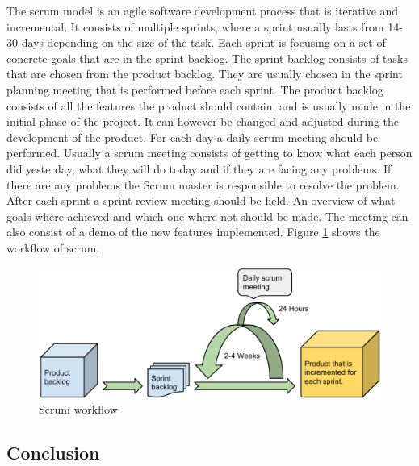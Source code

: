 The scrum model is an agile software development process that is iterative and incremental.
It consists of multiple sprints, where a sprint usually lasts from 14-30 days depending on the size of the task.
Each sprint is focusing on a set of concrete goals that are in the sprint backlog.
The sprint backlog consists of tasks that are chosen from the product backlog. 
They are usually chosen in the sprint planning meeting that is performed before each sprint.
The product backlog consists of all the features the product should contain, and is usually made in the initial phase of the project.
It can however be changed and adjusted during the development of the product.
For each day a daily scrum meeting should be performed. 
Usually a scrum meeting consists of getting to know what each person did yesterday, what they will do today and if they are facing any problems.
If there are any problems the Scrum master is responsible to resolve the problem.
After each sprint a sprint review meeting should be held.
An overview of what goals where achieved and which one where not should be made.
The meeting can also consist of a demo of the new features implemented. 
Figure \ref{figure:scrum-workflow} shows the workflow of scrum.

\begin{figure}[h]
\begin{center}
\includegraphics[scale=0.5]{../Figures/Scrum-workflow.pdf}
\end{center}
\caption{Scrum workflow}
\label{figure:scrum-workflow}
\end{figure}

\subsection{Conclusion}

